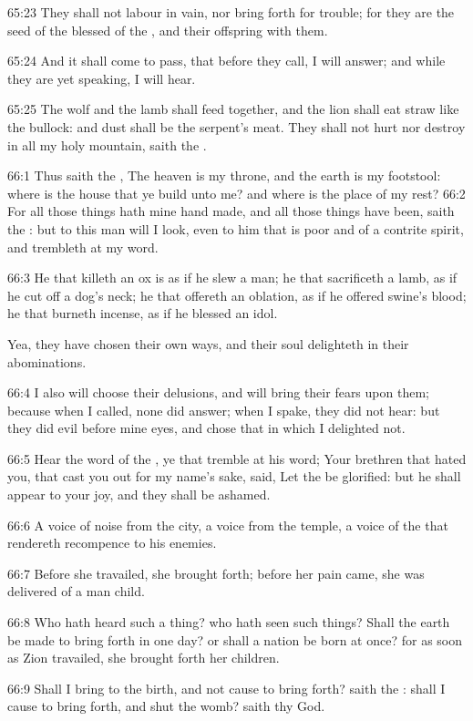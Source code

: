 65:23 They shall not labour in vain, nor bring forth for trouble; for they are the seed of the blessed of the \LORD, and their offspring with them.

65:24 And it shall come to pass, that before they call, I will answer; and while they are yet speaking, I will hear.

65:25 The wolf and the lamb shall feed together, and the lion shall eat straw like the bullock: and dust shall be the serpent's meat. They shall not hurt nor destroy in all my holy mountain, saith the \LORD.

66:1 Thus saith the \LORD, The heaven is my throne, and the earth is my footstool: where is the house that ye build unto me? and where is the place of my rest?  66:2 For all those things hath mine hand made, and all those things have been, saith the \LORD: but to this man will I look, even to him that is poor and of a contrite spirit, and trembleth at my word.

66:3 He that killeth an ox is as if he slew a man; he that sacrificeth a lamb, as if he cut off a dog's neck; he that offereth an oblation, as if he offered swine's blood; he that burneth incense, as if he blessed an idol.

Yea, they have chosen their own ways, and their soul delighteth in their abominations.

66:4 I also will choose their delusions, and will bring their fears upon them; because when I called, none did answer; when I spake, they did not hear: but they did evil before mine eyes, and chose that in which I delighted not.

66:5 Hear the word of the \LORD, ye that tremble at his word; Your brethren that hated you, that cast you out for my name's sake, said, Let the \LORD be glorified: but he shall appear to your joy, and they shall be ashamed.

66:6 A voice of noise from the city, a voice from the temple, a voice of the \LORD that rendereth recompence to his enemies.

66:7 Before she travailed, she brought forth; before her pain came, she was delivered of a man child.

66:8 Who hath heard such a thing? who hath seen such things? Shall the earth be made to bring forth in one day? or shall a nation be born at once?  for as soon as Zion travailed, she brought forth her children.

66:9 Shall I bring to the birth, and not cause to bring forth? saith the \LORD: shall I cause to bring forth, and shut the womb? saith thy God.

